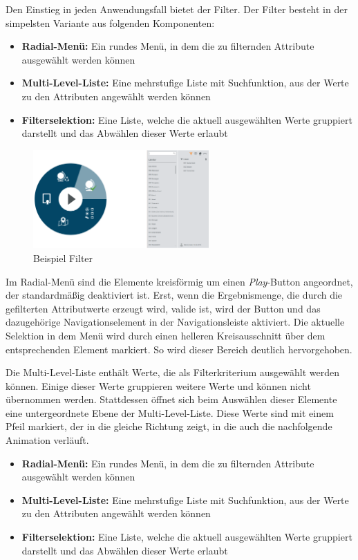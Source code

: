 Den Einstieg in jeden Anwendungsfall bietet der Filter. Der Filter besteht in der simpelsten Variante aus folgenden Komponenten:
\begin{itemize}
	\item \textbf{Radial-Menü:} Ein rundes Menü, in dem die zu filternden Attribute ausgewählt werden können
	\item \textbf{Multi-Level-Liste:} Eine mehrstufige Liste mit Suchfunktion, aus der Werte zu den Attributen angewählt werden können
	\item \textbf{Filterselektion:} Eine Liste, welche die aktuell ausgewählten Werte gruppiert darstellt und das Abwählen dieser Werte erlaubt
\end{itemize}
\begin{figure}[H]
 \centering
 \includegraphics[width=0.6\textwidth]{grafiken/filter_short.png}
 \caption{Beispiel Filter}
 \label{fig:filter}
\end{figure}
Im Radial-Menü sind die Elemente kreisförmig um einen \textit{Play}-Button angeordnet, der standardmäßig deaktiviert ist. Erst, wenn die Ergebnismenge, die durch die gefilterten Attributwerte erzeugt wird, valide ist, wird der Button und das dazugehörige Navigationselement in der Navigationsleiste aktiviert. Die aktuelle Selektion in dem Menü wird durch einen helleren Kreisausschnitt über dem entsprechenden Element markiert. So wird dieser Bereich deutlich hervorgehoben.\par
Die Multi-Level-Liste enthält Werte, die als Filterkriterium ausgewählt werden können. Einige dieser Werte gruppieren weitere Werte und können nicht übernommen werden. Stattdessen öffnet sich beim Auswählen dieser Elemente eine untergeordnete Ebene der Multi-Level-Liste. Diese Werte sind mit einem Pfeil markiert, der in die gleiche Richtung zeigt, in die auch die nachfolgende Animation verläuft.\par
\begin{itemize}
	\item \textbf{Radial-Menü:} Ein rundes Menü, in dem die zu filternden Attribute ausgewählt werden können
	\item \textbf{Multi-Level-Liste:} Eine mehrstufige Liste mit Suchfunktion, aus der Werte zu den Attributen angewählt werden können
	\item \textbf{Filterselektion:} Eine Liste, welche die aktuell ausgewählten Werte gruppiert darstellt und das Abwählen dieser Werte erlaubt
\end{itemize}
